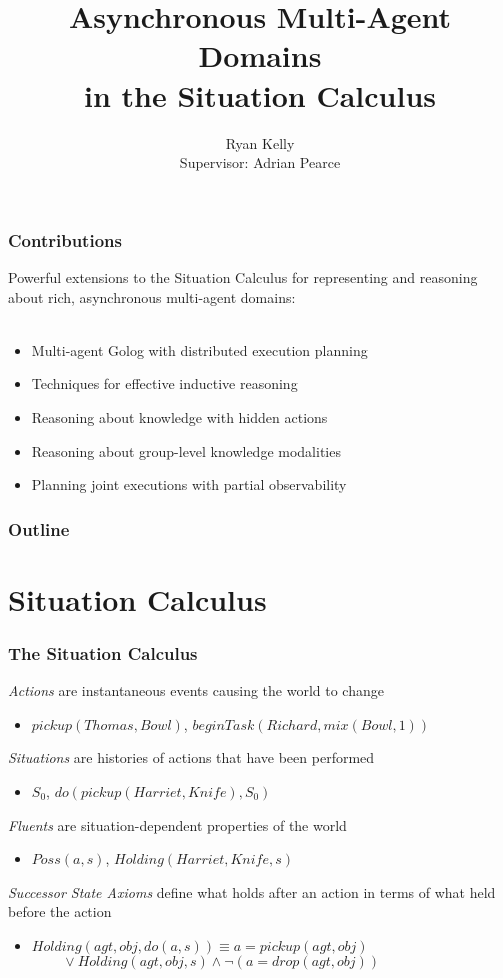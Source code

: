 \documentclass{beamer}
\title{Asynchronous Multi-Agent Domains\\ in the Situation Calculus}
\author[Ryan Kelly]{Ryan Kelly\\ Supervisor: Adrian Pearce}
\begin{document}
\begin{frame}
  \titlepage
\end{frame}

\begin{frame}
  \frametitle{Contributions}
  Powerful extensions to the Situation Calculus for representing and reasoning
  about rich, asynchronous multi-agent domains:
  \ \\
  \ \\
  \begin{itemize}
  \item Multi-agent Golog with distributed execution planning
  \item Techniques for effective inductive reasoning
  \item Reasoning about knowledge with hidden actions
  \item Reasoning about group-level knowledge modalities
  \item Planning joint executions with partial observability
  \end{itemize}
\end{frame}

\begin{frame}
  \frametitle{Outline}
  \tableofcontents
\end{frame}

\section{Situation Calculus}

\begin{frame}
\frametitle{The Situation Calculus}
\emph{Actions} are instantaneous events causing the world to change
\begin{itemize}
  \item $pickup(Thomas,Bowl)$, $beginTask(Richard,mix(Bowl,1))$
\end{itemize}
\emph{Situations} are histories of actions that have been performed
\begin{itemize}
  \item $S_0$, $do(pickup(Harriet,Knife),S_0)$
\end{itemize}
\emph{Fluents} are situation-dependent properties of the world
\begin{itemize}
  \item $Poss(a,s)$, $Holding(Harriet,Knife,s)$
\end{itemize}
\emph{Successor State Axioms} define what holds after an action in terms of what held before the action
\begin{itemize}
  \item $Holding(agt,obj,do(a,s)) \equiv a = pickup(agt,obj)$ \\
        $\,\,\,\,\,\,\,\,\,\,\,\,\,\vee Holding(agt,obj,s) \wedge \neg\left(a = drop(agt,obj)\right)$
\end{itemize}
\end{frame}
\end{document}
